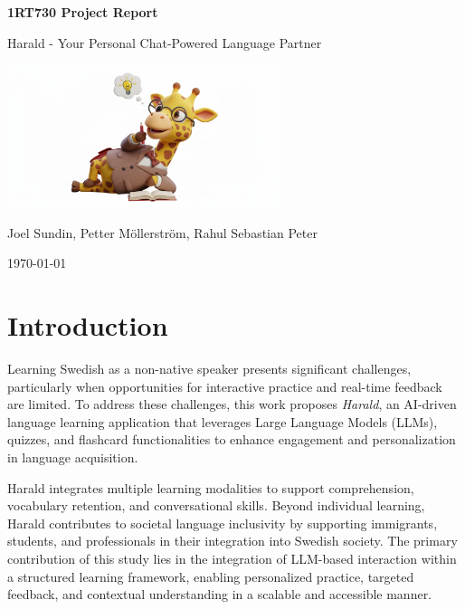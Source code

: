 \documentclass[a4paper,10pt]{article}
\begin{document}
\begin{titlepage}
    \centering
    \vspace*{2cm}
    {\Huge \textbf{1RT730 Project Report} \par}
    \vspace{0.5cm}
    {\LARGE Harald - Your Personal Chat-Powered Language Partner \par}
    
    \vspace{2cm}
    \includegraphics[width=0.6\textwidth]{cute_thinking_harald.png} %
    \vspace{2cm}
    
    {\Large Joel Sundin, Petter Möllerström, Rahul Sebastian Peter \par}
    \vspace{1cm}
    {\large \today \par}
\end{titlepage}   
\newpage

 \section{Introduction}
Learning Swedish as a non-native speaker presents significant challenges, particularly when opportunities for interactive practice and real-time feedback are limited. To address these challenges, this work proposes \textit{Harald}, an AI-driven language learning application that leverages Large Language Models (LLMs), quizzes, and flashcard functionalities to enhance engagement and personalization in language acquisition.

Harald integrates multiple learning modalities to support comprehension, vocabulary retention, and conversational skills. Beyond individual learning, Harald contributes to societal language inclusivity by supporting immigrants, students, and professionals in their integration into Swedish society. The primary contribution of this study lies in the integration of LLM-based interaction within a structured learning framework, enabling personalized practice, targeted feedback, and contextual understanding in a scalable and accessible manner.
\end{document}
